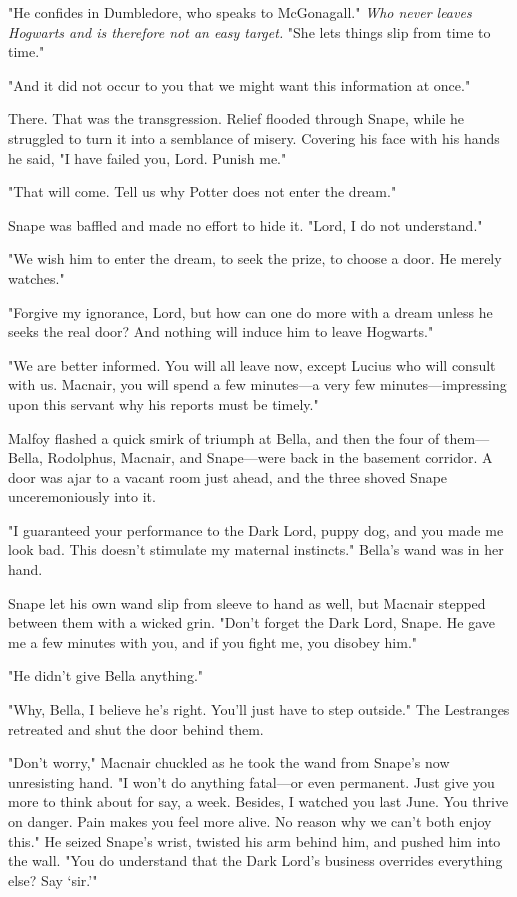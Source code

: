 "He confides in Dumbledore, who speaks to{\el} McGonagall." \emph{Who never leaves Hogwarts and is therefore not an easy target.} "She lets things slip from time to time."

"And it did not occur to you that we might want this information at once."

There. That was the transgression. Relief flooded through Snape, while he struggled to turn it into a semblance of misery. Covering his face with his hands he said, "I have failed you, Lord. Punish me."

"That will come. Tell us why Potter does not enter the dream."

Snape was baffled and made no effort to hide it. "Lord, I do not understand."

"We wish him to enter the dream, to seek the prize, to choose a door. He merely watches."

"Forgive my ignorance, Lord, but how can one do more with a dream unless he seeks the real door? And nothing will induce him to leave Hogwarts."

"We are better informed. You will all leave now, except Lucius who will consult with us. Macnair, you will spend a few minutes—a very few minutes—impressing upon this servant why his reports must be timely."

Malfoy flashed a quick smirk of triumph at Bella, and then the four of them—Bella, Rodolphus, Macnair, and Snape—were back in the basement corridor. A door was ajar to a vacant room just ahead, and the three shoved Snape unceremoniously into it.

"I guaranteed your performance to the Dark Lord, puppy dog, and you made me look bad. This doesn't stimulate my maternal instincts." Bella's wand was in her hand.

Snape let his own wand slip from sleeve to hand as well, but Macnair stepped between them with a wicked grin. "Don't forget the Dark Lord, Snape. He gave me a few minutes with you, and if you fight me, you disobey him."

"He didn't give Bella anything."

"Why, Bella, I believe he's right. You'll just have to step outside." The Lestranges retreated and shut the door behind them.

"Don't worry," Macnair chuckled as he took the wand from Snape's now unresisting hand. "I won't do anything fatal—or even permanent. Just give you more to think about for say, a week. Besides, I watched you last June. You thrive on danger. Pain makes you feel more alive. No reason why we can't both enjoy this." He seized Snape's wrist, twisted his arm behind him, and pushed him into the wall. "You do understand that the Dark Lord's business overrides everything else? Say `sir.'"

